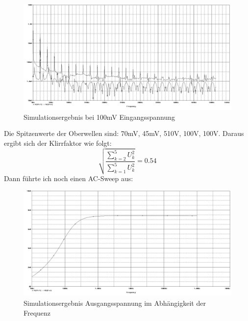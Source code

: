 \begin{figure}[H]
	\centering
	\includegraphics[width=\linewidth]{versuch5/spice/5313f2.png}
	\caption{Simulationsergebnis bei 100mV Eingangsspannung}
\end{figure}
Die Spitzenwerte der Oberwellen sind: 70mV, 45mV, 510\µ V, 100\µ V, 100\µ V. Daraus ergibt sich der Klirrfaktor wie folgt:
\[ \sqrt{\frac{\sum_{k=2}^5U_k^2}{\sum_{k=1}^5U_k^2}}=0.54 \]
Dann führte ich noch einen AC-Sweep aus:
\begin{figure}[H]
	\centering
	\includegraphics[width=\linewidth]{versuch5/spice/5314.png}
	\caption{Simulationsergebnis Ausgangsspannung im Abhängigkeit der Frequenz}
\end{figure}


